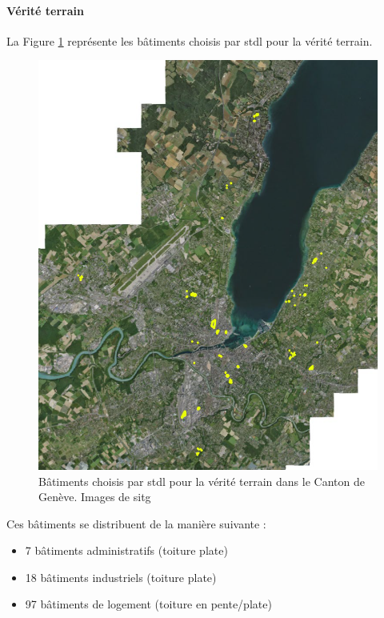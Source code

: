 \paragraph{Vérité terrain}
\par{La Figure \ref{fig:stdl_02_verite_terrain} représente les bâtiments choisis par \acrshort{stdl} pour la vérité terrain.}
\begin{figure}[H]
    \centering
    \includegraphics[width=1\linewidth]{02-main//figures/ch2/stdl_02_verite_terrain.png}
    \caption{Bâtiments choisis par \acrshort{stdl} pour la vérité terrain dans le Canton de Genève. Images de \acrshort{sitg}}
    \label{fig:stdl_02_verite_terrain}
\end{figure}
\par{Ces bâtiments se distribuent de la manière suivante :}
\begin{itemize}
    \item 7 bâtiments administratifs (toiture plate)
    \item 18 bâtiments industriels (toiture plate)
    \item 97 bâtiments de logement (toiture en pente/plate)
\end{itemize}
